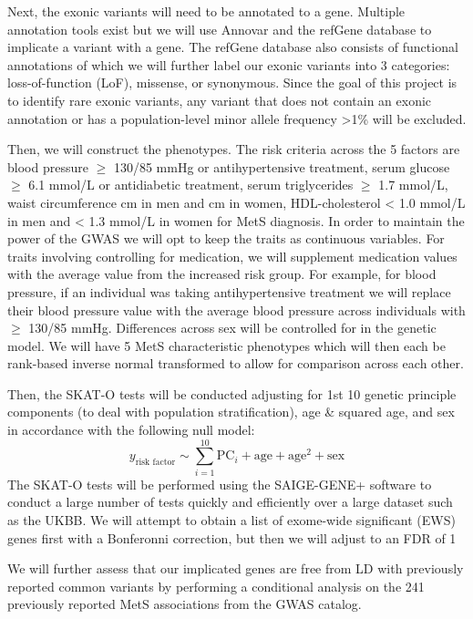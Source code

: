 \documentclass[11pt]{article}
\begin{document}
Next, the exonic variants will need to be annotated to a gene. Multiple annotation tools exist but we will use Annovar and the refGene database to implicate a variant with a gene. The refGene database also consists of functional annotations of which we will further label our exonic variants into 3 categories: loss-of-function (LoF), missense, or synonymous. Since the goal of this project is to identify rare exonic variants, any variant that does not contain an exonic annotation or has a population-level minor allele frequency >1\% will be excluded.

Then, we will construct the phenotypes. The risk criteria across the 5 factors are blood pressure $\ge$ 130/85 mmHg or antihypertensive treatment, serum glucose $\ge$ 6.1 mmol/L or antidiabetic treatment, serum triglycerides $\ge$ 1.7 mmol/L, waist circumference  cm in men and  cm in women, HDL-cholesterol < 1.0 mmol/L in men and < 1.3 mmol/L in women for MetS diagnosis. In order to maintain the power of the GWAS we will opt to keep the traits as continuous variables. For traits involving controlling for medication, we will supplement medication values with the average value from the increased risk group. For example, for blood pressure, if an individual was taking antihypertensive treatment we will replace their blood pressure value with the average blood pressure across individuals with $\ge$ 130/85 mmHg. Differences across sex will be controlled for in the genetic model. We will have 5 MetS characteristic phenotypes which will then each be rank-based inverse normal transformed to allow for comparison across each other.

Then, the SKAT-O tests will be conducted adjusting for 1st 10 genetic principle components (to deal with population stratification), age \& squared age, and sex in accordance with the following null model:
$$y_{\text{risk factor}} \sim \sum_{i=1}^{10} \text{PC}_i + \text{age} + \text{age}^2 + \text{sex}$$
The SKAT-O tests will be performed using the SAIGE-GENE+ software to conduct a large number of tests quickly and efficiently over a large dataset such as the UKBB. We will attempt to obtain a list of exome-wide significant (EWS) genes first with a Bonferonni correction, but then we will adjust to an FDR of 1%

We will further assess that our implicated genes are free from LD with previously reported common variants by performing a conditional analysis on the 241 previously reported MetS associations from the GWAS catalog.
\end{document}
